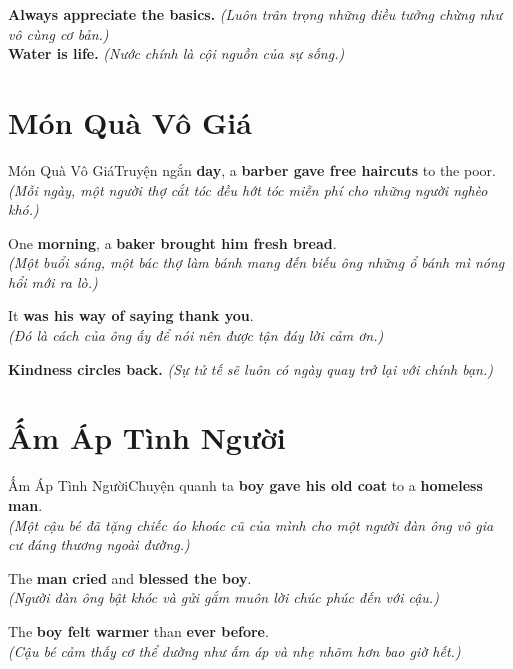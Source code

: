\begin{baihoc}
  \textbf{Always appreciate the basics.} \textit{(Luôn trân trọng những điều tưởng chừng như vô cùng cơ bản.)}\\
  \textbf{Water is life.} \textit{(Nước chính là cội nguồn của sự sống.)}
\end{baihoc}

\vspace{0.8cm}

\ngayDay{}
\section{Món Quà Vô Giá}
\begin{truyen}{Món Quà Vô Giá}{Truyện ngắn}
 \textbf{day}, a \textbf{barber gave free haircuts} to the poor.\\
\textit{(Mỗi ngày, một người thợ cắt tóc đều hớt tóc miễn phí cho những người nghèo khó.)}

One \textbf{morning}, a \textbf{baker brought him fresh bread}.\\
\textit{(Một buổi sáng, một bác thợ làm bánh mang đến biếu ông những ổ bánh mì nóng hổi mới ra lò.)}

It \textbf{was his way of saying thank you}.\\
\textit{(Đó là cách của ông ấy để nói nên được tận đáy lời cảm ơn.)}
\end{truyen}

\begin{baihoc}
  \textbf{Kindness circles back.} \textit{(Sự tử tế sẽ luôn có ngày quay trở lại với chính bạn.)}
\end{baihoc}

\vspace{0.8cm}

\ngayDay{}
\section{Ấm Áp Tình Người}
\begin{truyen}{Ấm Áp Tình Người}{Chuyện quanh ta}
 \textbf{boy gave his old coat} to a \textbf{homeless man}.\\
\textit{(Một cậu bé đã tặng chiếc áo khoác cũ của mình cho một người đàn ông vô gia cư đáng thương ngoài đường.)}

The \textbf{man cried} and \textbf{blessed the boy}.\\
\textit{(Người đàn ông bật khóc và gửi gắm muôn lời chúc phúc đến với cậu.)}

The \textbf{boy felt warmer} than \textbf{ever before}.\\
\textit{(Cậu bé cảm thấy cơ thể dường như ấm áp và nhẹ nhõm hơn bao giờ hết.)}
\end{truyen}

